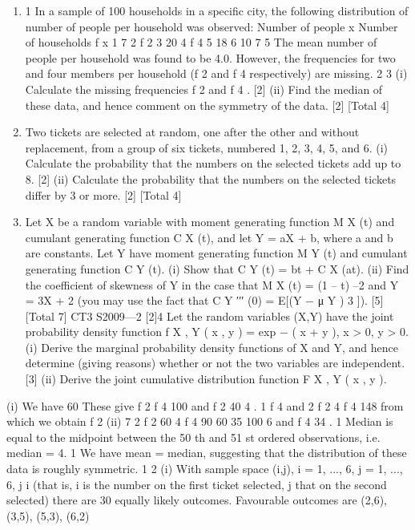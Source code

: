 \documentclass[a4paper,12pt]{article}
\begin{document}
\begin{enumerate}
\item 1
In a sample of 100 households in a specific city, the following distribution of number
of people per household was observed:
Number of people x
Number of households f x
1
7
2
f 2
3
20
4
f 4
5
18
6
10
7
5
The mean number of people per household was found to be 4.0. However, the
frequencies for two and four members per household (f 2 and f 4 respectively) are
missing.
2
3
(i) Calculate the missing frequencies f 2 and f 4 .
[2]
(ii) Find the median of these data, and hence comment on the symmetry of the
data.
[2]
[Total 4]
\item Two tickets are selected at random, one after the other and without replacement, from
a group of six tickets, numbered 1, 2, 3, 4, 5, and 6.
(i) Calculate the probability that the numbers on the selected tickets add up to 8.
[2]
(ii) Calculate the probability that the numbers on the selected tickets differ by
3 or more.
[2]
[Total 4]
\item Let X be a random variable with moment generating function M X (t) and cumulant
generating function C X (t), and let Y = aX + b, where a and b are constants. Let Y have
moment generating function M Y (t) and cumulant generating function C Y (t).
(i) Show that C Y (t) = bt + C X (at).
(ii) Find the coefficient of skewness of Y in the case that M X (t) = (1 – t) –2 and
Y = 3X + 2 (you may use the fact that C Y ′′′ (0) = E[(Y − μ Y ) 3 ]).
[5]
[Total 7]
CT3 S2009—2
[2]4
Let the random variables (X,Y) have the joint probability density function
f X , Y ( x , y ) = exp{ − ( x + y )}, x > 0, y > 0.
(i) Derive the marginal probability density functions of X and Y, and hence
determine (giving reasons) whether or not the two variables are independent.
[3]
(ii) Derive the joint cumulative distribution function F X , Y ( x , y ).
\end{enumerate}
(i)
We have 60
These give f 2
f 4 100 and
f 2
40
4 .
1
f 4 and 2 f 2 4 f 4 148
from which we obtain f 2
(ii)
7 2 f 2 60 4 f 4 90 60 35
100
6 and f 4
34 .
1
Median is equal to the midpoint between the 50 th and 51 st ordered
observations, i.e. median = 4. 1
We have mean = median, suggesting that the distribution of these data is
roughly symmetric. 1
2
(i)
With sample space {(i,j), i = 1, ..., 6, j = 1, ..., 6, j
i}
(that is, i is the number on the first ticket selected, j that on the second
selected) there are 30 equally likely outcomes.
Favourable outcomes are (2,6), (3,5), (5,3), (6,2)
\end{document}
